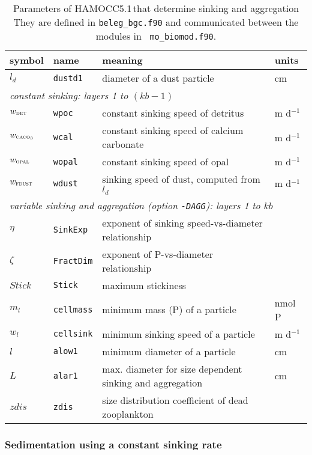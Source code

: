 \documentclass[11pt,a4paper,fleqn,twoside]{article}
\def\det{\text{\textsc{det}}\,}
\def\opal{\text{\textsc{opal}}\,}
\def\cal{\text{\textsc{caco$_3$}}\,}
\def\fdust{\text{\textsc{fdust}}\,}
\newcommand{\sink}{m d$^{-1}$\,}
\newcommand{\ham}{HAMOCC5.1\,}
\begin{document}
\begin{table}[htb]
{\caption{\label{tab_agg_params}  Parameters of \ham that determine sinking and aggregation 
They are defined in {\tt beleg\_bgc.f90} and  communicated between the modules in {\tt
mo\_biomod.f90}.}}
\renewcommand{\baselinestretch}{1}
\vspace{.2cm}
\footnotesize
\begin{center}
\begin{tabular}{llp{7cm}l} \hline 
symbol & name & meaning & units \\ \hline
$l_d$&{\tt dustd1}& diameter of a dust particle& cm \\
\multicolumn{4}{l}{\rule{0mm}{4mm}{\it constant sinking: layers 1 to $(kb-1)$}}\\ \hline
$w_\det$&{\tt wpoc}& constant sinking speed of detritus  &\sink\\
$w_\cal$&{\tt wcal}& constant sinking speed of calcium carbonate &\sink\\
$w_\opal$&{\tt wopal}& constant sinking speed of opal &\sink\\ 
$w_\fdust$&{\tt wdust}& sinking speed of dust, computed from $l_d$ &\sink\\ 
\multicolumn{4}{l}{\rule{0mm}{4mm}{\it variable sinking and aggregation (option
{\tt -DAGG}): layers 1 to $kb$}}\\ \hline
$\eta$&{\tt SinkExp}& exponent of sinking speed-vs-diameter relationship & \\
$\zeta$&{\tt FractDim}& exponent of P-vs-diameter relationship & \\
$Stick$&{\tt Stick}& maximum stickiness & \\
$m_l$&{\tt cellmass}& minimum mass (P) of a particle& nmol P \\
$w_l$&{\tt cellsink}& minimum sinking speed of a particle& \sink\\
$l$&{\tt alow1}& minimum diameter of a particle& cm \\
$L$&{\tt alar1}& max. diameter for size dependent sinking and aggregation & cm \\
$zdis$&{\tt  zdis}& size distribution coefficient of dead zooplankton & \\ \hline
\end{tabular}
\end{center}
\renewcommand{\baselinestretch}{1.5}
\normalsize
\end{table}

\subsubsection{\label{sinking_constant}Sedimentation using a constant sinking rate}
\end{document}
